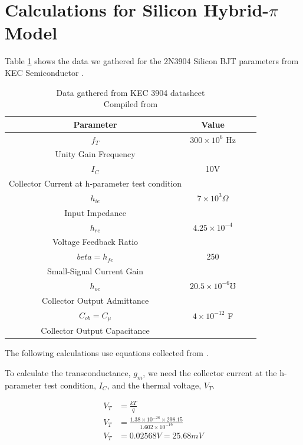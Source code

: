 \documentclass[conference]{IEEEtran}
\begin{document}
\section{Calculations for Silicon Hybrid-$\pi$ Model}
\label{appendix-Si}

Table \ref{tab:kec-3904} shows the data we gathered for the 2N3904 Silicon BJT parameters from KEC Semiconductor \cite{3904}.

\begin{table}[htbp]
    \centering
    \caption{Data gathered from KEC 3904 datasheet \\ Compiled from \cite{3904}}
    \begin{tabular}{|c|c|c|c|}
        \hline
        Parameter & Value\\
        \hline
        $f_T$ & $300 \times 10^6$ Hz \\
        Unity Gain Frequency & \\
        \hline
        $I_C$ & 10V \\
        Collector Current at h-parameter test condition & \\
        \hline
        $h_{ie}$ & $7 \times 10^{3} \Omega$ \\
        Input Impedance & \\
        \hline
        $h_{re}$ & $4.25 \times 10^{-4}$ \\
        Voltage Feedback Ratio & \\
        \hline
        $beta = h_{fe}$ & 250 \\
        Small-Signal Current Gain & \\
        \hline
        $h_{oe}$ & $20.5 \times 10^{-6} \mho$ \\
        Collector Output Admittance & \\
        \hline
        $C_{ob} = C_{\mu}$ & $4 \times 10^{-12}$ F \\
        Collector Output Capacitance & \\
        \hline
    \end{tabular}
    \label{tab:kec-3904}
\end{table}

The following calculations use equations collected from \cite{Malik1990}.

To calculate the transconductance, $g_m$, we need the collector current at the h-parameter test condition, $I_C$, and the thermal
voltage, $V_T$.

\begin{equation}
    \begin{aligned}
        V_T &= \frac{kT}{q} \\
        V_T &= \frac{1.38 \times 10^{-28} \times 298.15}{1.602 \times 10^{-19}} \\
        V_T &= 0.02568V = 25.68 mV
    \end{aligned}
\end{equation}
\end{document}
